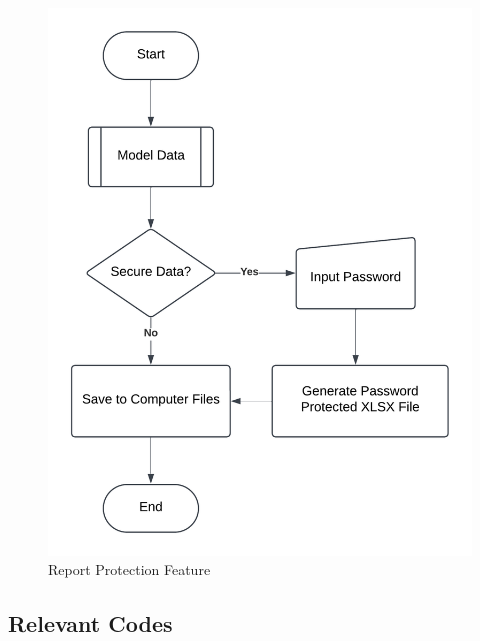 \begin{appendices}
\begin{centerappendixtitle}
		\begin{figure}[h]
			\centering
			\caption{Report Protection Feature}
			\label{protectFlow}
			\includegraphics[width=\linewidth]{appendix/protect f}
		\end{figure}
		
		
		
	\end{centerappendixtitle}
	
	\begin{centerappendixtitle}
		\chapter{Relevant Codes}
		\pagebreak
		

\end{centerappendixtitle}
\end{appendices}
